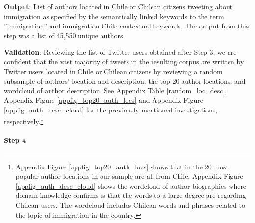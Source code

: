             
            
                        
        
        
        \textbf{Output}: List of authors located in Chile or Chilean citizens tweeting about immigration as specified by the semantically linked keywords to the term ''immigration'' and immigration-Chile-contextual keywords. The output from this step was a list of 45,550 unique authors.
    
        
        \textbf{Validation}: Reviewing the list of Twitter users obtained after Step 3, we are confident that the vast majority of tweets in the resulting corpus are written by Twitter users located in Chile or Chilean citizens by reviewing a random subsample of authors' location and description, the top 20 author locations, and wordcloud of author description. See Appendix Table \ref{random_loc_desc}, Appendix Figure \ref{appfig_top20_auth_locs} and Appendix Figure \ref{appfig_auth_desc_cloud} for the previously mentioned investigations, respectively.\footnote{Appendix Figure \ref{appfig_top20_auth_locs} shows that in the 20 most popular author locations in our sample are all from Chile. Appendix Figure \ref{appfig_auth_desc_cloud} shows the wordcloud of author biographies where domain knowledge confirms is that the words to a large degree are regarding Chilean users. The wordcloud includes Chilean words and phrases related to the topic of immigration in the country.}
        
        
        \paragraph{Step 4} 
        
